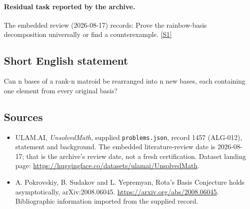 \documentclass[11pt,a4paper]{article}
\newcommand{\sref}[2]{\hyperlink{source:#1:#2}{[S#2]}}
\begin{document}
\paragraph{Residual task reported by the archive.}

The embedded review (2026-08-17) records: Prove the rainbow-basis decomposition universally or find a counterexample. \sref{1457}{1}

\subsection{Short English statement}

Can n bases of a rank-n matroid be rearranged into n new bases, each containing one element from every original basis?

\subsection{Sources}

{\small

\begin{itemize}

\item[\hypertarget{source:1457:1}{S1}] ULAM.AI, \emph{UnsolvedMath}, supplied \texttt{problems.json}, record 1457 (ALG-012), statement and background. The embedded literature-review date is 2026-08-17; that is the archive’s review date, not a fresh certification. Dataset landing page: \url{https://huggingface.co/datasets/ulamai/UnsolvedMath}.

\item[\hypertarget{source:1457:2}{S2}] A. Pokrovskiy, B. Sudakov and L. Yepremyan, Rota's Basis Conjecture holds asymptotically, arXiv:2008.06045. \url{https://arxiv.org/abs/2008.06045}. Bibliographic information imported from the supplied record.

\end{itemize}

}

\label{end:1457}
\end{document}
